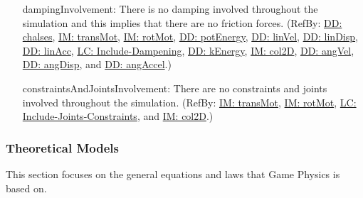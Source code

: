 \documentclass[12pt]{article}
\begin{document}
\begin{itemize}
\item[dampingInvolvement:\phantomsection\label{assumpDI}]There is no damping involved throughout the simulation and this implies that there are no friction forces. (RefBy: \hyperref[DD:chalses]{DD: chalses}, \hyperref[IM:transMot]{IM: transMot}, \hyperref[IM:rotMot]{IM: rotMot}, \hyperref[DD:potEnergy]{DD: potEnergy}, \hyperref[DD:linVel]{DD: linVel}, \hyperref[DD:linDisp]{DD: linDisp}, \hyperref[DD:linAcc]{DD: linAcc}, \hyperref[lcID]{LC: Include-Dampening}, \hyperref[DD:kEnergy]{DD: kEnergy}, \hyperref[IM:col2D]{IM: col2D}, \hyperref[DD:angVel]{DD: angVel}, \hyperref[DD:angDisp]{DD: angDisp}, and \hyperref[DD:angAccel]{DD: angAccel}.)
\item[constraintsAndJointsInvolvement:\phantomsection\label{assumpCAJI}]There are no constraints and joints involved throughout the simulation. (RefBy: \hyperref[IM:transMot]{IM: transMot}, \hyperref[IM:rotMot]{IM: rotMot}, \hyperref[lcIJC]{LC: Include-Joints-Constraints}, and \hyperref[IM:col2D]{IM: col2D}.)
\end{itemize}
\subsubsection{Theoretical Models}
\label{Sec:TMs}
This section focuses on the general equations and laws that Game Physics is based on.
\par~
\end{document}
